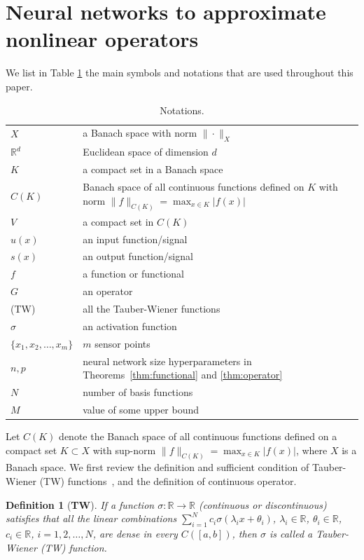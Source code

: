 \documentclass[11pt]{article}
\newtheorem{definition}{Definition}
\begin{document}



\appendix

\section{Neural networks to approximate nonlinear operators}

We list in Table \ref{tab:notation} the main symbols and notations that are used throughout this paper.

\begin{table}[htbp]
\centering
\caption{Notations.}
\label{tab:notation}
\begin{tabular}{ll}
\toprule
$X$ & a Banach space with norm $\| \cdot \|_X$ \\
$\mathbb{R}^d$ & Euclidean space of dimension $d$ \\
$K$ & a compact set in a Banach space \\
$C(K)$ & Banach space of all continuous functions defined on $K$ with norm $\|f \|_{C(K)} = \max_{x \in K}|f(x)|$ \\
$V$ & a compact set in $C(K)$ \\
$u(x)$ & an input function/signal \\
$s(x)$ & an output function/signal \\
$f$ & a function or functional \\
$G$ & an operator \\
(TW) & all the Tauber-Wiener functions \\
$\sigma$ & an activation function \\
$\{x_1, x_2, \dots, x_m\}$ & $m$ sensor points \\
$n, p$ & neural network size hyperparameters in Theorems~\ref{thm:functional} and \ref{thm:operator} \\
$N$ & number of basis functions \\
$M$ & value of some upper bound \\
\bottomrule
\end{tabular}
\end{table}

Let $C(K)$ denote the Banach space of all continuous functions defined on a compact set $K \subset X$ with sup-norm $\|f \|_{C(K)} = \max_{x \in K}|f(x)|$, where $X$ is a Banach space. We first review the definition and sufficient condition of Tauber-Wiener (TW) functions~\cite{chen1995universal}, and the definition of continuous operator.

\begin{definition}[\textbf{TW}]
If a function $\sigma : \mathbb{R} \to \mathbb{R}$ (continuous or discontinuous) satisfies that all the linear combinations $\sum_{i=1}^N c_i\sigma(\lambda_ix+\theta_i)$, $\lambda_i \in \mathbb{R}$, $\theta_i \in \mathbb{R}$, $c_i \in \mathbb{R}$, $i=1,2,\dots,N$, are dense in every $C([a,b])$, then $\sigma$ is called a Tauber-Wiener (TW) function.
\end{definition}
\end{document}
